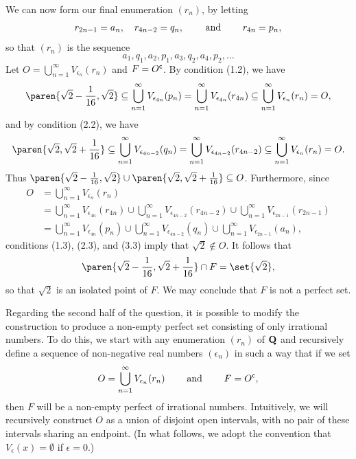 \documentclass{lew98_solutions}
\begin{document}
\begin{solution}
\begin{enumerate}
        \noindent We can now form our final enumeration \( (r_n) \), by letting
        \[
            r_{2n-1} = a_n, \quad r_{4n-2} = q_n, \hspace{8mm} \text{and} \hspace{8mm} r_{4n} = p_n,
        \]
        so that \( (r_n) \) is the sequence
        \[
            a_1, q_1, a_2, p_1, a_3, q_2, a_4, p_2, \ldots
        \]
        Let \( O = \bigcup_{n=1}^{\infty} V_{\epsilon_n}(r_n) \) and \( F = O^{\mathsf{c}} \). By condition (1.2), we have
        \[
            \paren{ \sqrt{2} - \frac{1}{16}, \sqrt{2} } \subseteq \bigcup_{n=1}^{\infty} V_{\epsilon_{4n}}(p_n) = \bigcup_{n=1}^{\infty} V_{\epsilon_{4n}}(r_{4n}) \subseteq \bigcup_{n=1}^{\infty} V_{\epsilon_n}(r_n) = O,
        \]
        and by condition (2.2), we have
        \[
            \paren{ \sqrt{2}, \sqrt{2} + \frac{1}{16} } \subseteq \bigcup_{n=1}^{\infty} V_{\epsilon_{4n-2}}(q_n) = \bigcup_{n=1}^{\infty} V_{\epsilon_{4n-2}}(r_{4n-2}) \subseteq \bigcup_{n=1}^{\infty} V_{\epsilon_n}(r_n) = O.
        \]
        Thus \( \paren{ \sqrt{2} - \tfrac{1}{16}, \sqrt{2} } \cup \paren{ \sqrt{2}, \sqrt{2} + \tfrac{1}{16} } \subseteq O \). Furthermore, since
        \begin{align*}
            O &= \bigcup_{n=1}^{\infty} V_{\epsilon_n}(r_n) \\[2mm]
            &= \bigcup_{n=1}^{\infty} V_{\epsilon_{4n}}(r_{4n}) \cup \bigcup_{n=1}^{\infty} V_{\epsilon_{4n-2}}(r_{4n-2}) \cup \bigcup_{n=1}^{\infty} V_{\epsilon_{2n-1}}(r_{2n-1}) \\[2mm]
            &= \bigcup_{n=1}^{\infty} V_{\epsilon_{4n}}(p_n) \cup \bigcup_{n=1}^{\infty} V_{\epsilon_{4n-2}}(q_n) \cup \bigcup_{n=1}^{\infty} V_{\epsilon_{2n-1}}(a_n),
        \end{align*}
        conditions (1.3), (2.3), and (3.3) imply that \( \sqrt{2} \not\in O \). It follows that
        \[
            \paren{ \sqrt{2} - \frac{1}{16}, \sqrt{2} + \frac{1}{16} } \cap F = \set{ \sqrt{2} },
        \]
        so that \( \sqrt{2} \) is an isolated point of \( F \). We may conclude that \( F \) is not a perfect set.

        \noindent \hrulefill

        \noindent Regarding the second half of the question, it is possible to modify the construction to produce a non-empty perfect set consisting of only irrational numbers. To do this, we start with any enumeration \( (r_n) \) of \( \mathbf{Q} \) and recursively define a sequence of non-negative real numbers \( (\epsilon_n) \) in such a way that if we set
        \[
            O = \bigcup_{n=1}^{\infty} V_{\epsilon_n}(r_n) \hspace{8mm} \text{and} \hspace{8mm} F = O^{\mathsf{c}},
        \]
        then \( F \) will be a non-empty perfect of irrational numbers. Intuitively, we will recursively construct \( O \) as a union of disjoint open intervals, with no pair of these intervals sharing an endpoint. (In what follows, we adopt the convention that \( V_{\epsilon}(x) = \emptyset \) if \( \epsilon = 0 \).)


\end{enumerate}
\end{solution}
\end{document}
